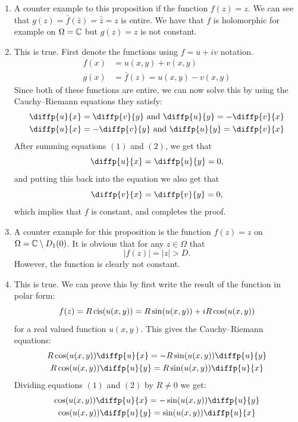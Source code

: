 \documentclass[11pt,a4paper]{article}
\begin{document}
\begin{solution} \phantom{}
\begin{enumerate}
\item[(1)] A counter example to this proposition if the function $f(z) = z$.
  We can see that $g(z) = \bar f(\bar z) = \bar {\bar z} = z$ is entire.
  We have that $f$ is holomorphic for example on $\Omega = \mathbb{C}$ but
  $g(z) = z$ is not constant.
\item[(2)] This is true.
  First denote the functions using $f = u + i v$ notation.
  \begin{align*}
    f(x) &= u(x,y) + v(x,y) \\
    g(x) &= \bar f (z) = u(x,y) - v(x,y)
  \end{align*}
  Since both of these functions are entire,
  we can now solve this by using the Cauchy--Riemann equations they satisfy:
  \begin{gather}
    \diffp{u}{x} = \diffp{v}{y} \stand \diffp{u}{y} = - \diffp{v}{x} \\
    \diffp{u}{x} = - \diffp{v}{y} \stand \diffp{u}{y} = \diffp{v}{x}
  \end{gather}
  After summing equations $(1)$ and $(2)$, we get that
  \[
    \diffp{u}{x} = \diffp{u}{y} = 0,
  \]
  and putting this back into the equation we also get that
  \[
    \diffp{v}{x} = \diffp{v}{y} = 0,
  \]
  which implies that $f$ is constant, and completes the proof.
\item[(3)] A counter example for this proposition is 
  the function $f(z) = z$ on $\Omega = \mathbb{C} \setminus D_1(0)$.
  It is obvious that for any $z \in \Omega$ that 
  \[
    |f(z)| = |z| > D.
  \]
  However, the function is clearly not constant.
  \setcounter{equation}{0}
\item[(4)] This is true.
  We can prove this by first write the result of the function in polar form:
  \[
    f(z) = R \operatorname{cis}(u(x,y)) = R \sin(u(x,y)) + i R \cos(u(x,y))
  \]
  for a real valued function $u(x,y)$.
  This gives the Cauchy--Riemann equations:
  \begin{gather}
    R \cos(u(x,y)) \diffp{u}{x} = - R \sin(u(x,y)) \diffp{u}{y} \\
    R \cos(u(x,y)) \diffp{u}{y} = R \sin(u(x,y)) \diffp{u}{x}
  \end{gather}
  Dividing equations $(1)$ and $(2)$ by $R \neq 0$ we get:
  \begin{gather}
    \cos(u(x,y)) \diffp{u}{x} = - \sin(u(x,y)) \diffp{u}{y} \\
    \cos(u(x,y)) \diffp{u}{y} = \sin(u(x,y)) \diffp{u}{x}

\end{gather}
\end{enumerate}
\end{solution}
\end{document}
